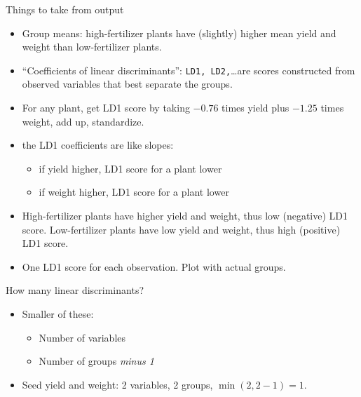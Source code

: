 \documentclass[ignorenonframetext,]{beamer}
\providecommand{\tightlist}{%
  \setlength{\itemsep}{0pt}\setlength{\parskip}{0pt}}
\begin{document}
\begin{frame}{Things to take from output}
\protect\hypertarget{things-to-take-from-output}{}

\begin{itemize}
\item
  Group means: high-fertilizer plants have (slightly) higher mean yield
  and weight than low-fertilizer plants.
\item
  ``Coefficients of linear discriminants'': \texttt{LD1,
  LD2,}\ldots are scores constructed from observed variables that best
  separate the groups.
\item
  For any plant, get LD1 score by taking \(-0.76\) times yield plus
  \(-1.25\) times weight, add up, standardize.
\item
  the LD1 coefficients are like slopes:

  \begin{itemize}
  \tightlist
  \item
    if yield higher, LD1 score for a plant lower
  \item
    if weight higher, LD1 score for a plant lower
  \end{itemize}
\item
  High-fertilizer plants have higher yield and weight, thus low
  (negative) LD1 score. Low-fertilizer plants have low yield and weight,
  thus high (positive) LD1 score.
\item
  One LD1 score for each observation. Plot with actual groups.
\end{itemize}

\end{frame}

\begin{frame}{How many linear discriminants?}
\protect\hypertarget{how-many-linear-discriminants}{}

\begin{itemize}
\item
  Smaller of these:

  \begin{itemize}
  \item
    Number of variables
  \item
    Number of groups \emph{minus 1}
  \end{itemize}
\item
  Seed yield and weight: 2 variables, 2 groups, \(\min(2,2-1)=1\).
\end{itemize}

\end{frame}
\end{document}
